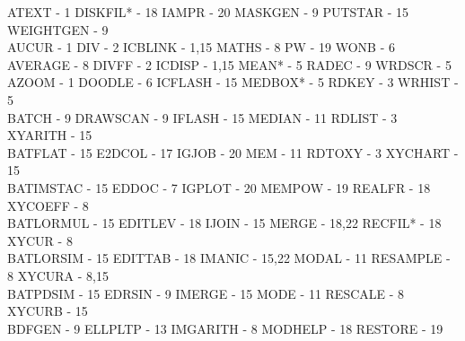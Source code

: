 {\begin{tabbing}
 ATEXT - 1                               \>DISKFIL* - 18
   \>IAMPR - 20                              \>
 MASKGEN - 9                             \>PUTSTAR - 15
   \>WEIGHTGEN - 9                           \\
 AUCUR - 1                               \>DIV - 2
   \>ICBLINK - 1,15                          \>
 MATHS - 8                               \>PW - 19
   \>WONB - 6                                \\
 AVERAGE - 8                             \>DIVFF - 2
   \>ICDISP - 1,15                           \>
 MEAN* - 5                               \>RADEC - 9
   \>WRDSCR - 5                              \\
 AZOOM - 1                               \>DOODLE - 6
   \>ICFLASH - 15                            \>
 MEDBOX* - 5                             \>RDKEY - 3
   \>WRHIST - 5                              \\
 BATCH - 9                               \>DRAWSCAN - 9
   \>IFLASH - 15                             \>
 MEDIAN - 11                             \>RDLIST - 3
   \>XYARITH - 15                            \\
 BATFLAT - 15                            \>E2DCOL - 17
   \>IGJOB - 20                              \>
 MEM - 11                                \>RDTOXY - 3
   \>XYCHART - 15                            \\
 BATIMSTAC - 15                          \>EDDOC - 7
   \>IGPLOT - 20                             \>
 MEMPOW - 19                             \>REALFR - 18
   \>XYCOEFF - 8                             \\
 BATLORMUL - 15                          \>EDITLEV - 18
   \>IJOIN - 15                              \>
 MERGE - 18,22                           \>RECFIL* - 18
   \>XYCUR - 8                               \\
 BATLORSIM - 15                          \>EDITTAB - 18
   \>IMANIC - 15,22                          \>
 MODAL - 11                              \>RESAMPLE - 8
   \>XYCURA - 8,15                           \\
 BATPDSIM - 15                           \>EDRSIN - 9
   \>IMERGE - 15                             \>
 MODE - 11                               \>RESCALE - 8
   \>XYCURB - 15                             \\
 BDFGEN - 9                              \>ELLPLTP - 13
   \>IMGARITH - 8                            \>
 MODHELP - 18                            \>RESTORE - 19

\end{tabbing}}
